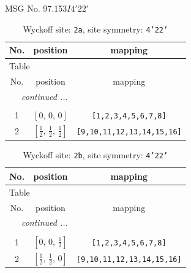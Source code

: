 \documentclass[fleqn,8pt]{jsarticle}
\begin{document}
\setcounter{MaxMatrixCols}{32}

\renewcommand{\tablename}{Table~}
\renewcommand{\figurename}{Figure~}
\begin{center}
\LARGE
MSG No. 97.153\quad$I4'22'$
\end{center}
\renewcommand{\arraystretch}{1.2}
\begin{longtable}{ccc}
\caption{Wyckoff site: {\tt 2a}, site symmetry: {\tt 4'22'}}
 \\
 \hline \hline
No. & position & mapping \\ \hline \endfirsthead

\multicolumn{2}{l}{\tablename\ \thetable{}} \\
 \hline \hline
No. & position & mapping \\ \hline \endhead

 \hline \hline
\multicolumn{2}{r}{\footnotesize\it continued ...} \\ \endfoot

 \hline \hline
\multicolumn{2}{r}{} \\ \endlastfoot

1 & $\left[ 0,\, 0,\, 0 \right]$ & {\tt [1,2,3,4,5,6,7,8]} \\ \hline
2 & $\left[ \frac{1}{2},\, \frac{1}{2},\, \frac{1}{2} \right]$ & {\tt [9,10,11,12,13,14,15,16]} \\
\end{longtable}
\renewcommand{\arraystretch}{1.2}
\begin{longtable}{ccc}
\caption{Wyckoff site: {\tt 2b}, site symmetry: {\tt 4'22'}}
 \\
 \hline \hline
No. & position & mapping \\ \hline \endfirsthead

\multicolumn{2}{l}{\tablename\ \thetable{}} \\
 \hline \hline
No. & position & mapping \\ \hline \endhead

 \hline \hline
\multicolumn{2}{r}{\footnotesize\it continued ...} \\ \endfoot

 \hline \hline
\multicolumn{2}{r}{} \\ \endlastfoot

1 & $\left[ 0,\, 0,\, \frac{1}{2} \right]$ & {\tt [1,2,3,4,5,6,7,8]} \\ \hline
2 & $\left[ \frac{1}{2},\, \frac{1}{2},\, 0 \right]$ & {\tt [9,10,11,12,13,14,15,16]} \\
\end{longtable}
\end{document}
